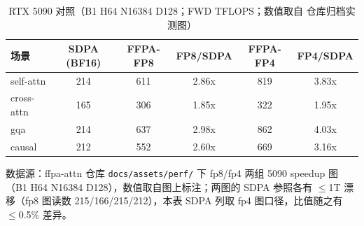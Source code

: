 \begin{table}[!htbp]
  \centering\small
  \caption{RTX 5090 对照（B1 H64 N16384 D128；FWD TFLOPS；数值取自
  仓库归档实测图）}\label{tab:33-5090}
  \begin{tabular}{lccccc}
    \toprule
    场景 & SDPA (BF16) & FFPA-FP8 & FP8/SDPA & FFPA-FP4 & FP4/SDPA \\
    \midrule
    self-attn  & 214 & 611 & 2.86x & 819 & 3.83x \\
    cross-attn & 165 & 306 & 1.85x & 322 & 1.95x \\
    gqa        & 214 & 637 & 2.98x & 862 & 4.03x \\
    causal     & 212 & 552 & 2.60x & 669 & 3.16x \\
    \bottomrule
  \end{tabular}

  \par\vspace{4pt}
  {\footnotesize 数据源：ffpa-attn 仓库
  \texttt{docs/\allowbreak{}assets/\allowbreak{}perf/} 下 fp8/fp4 两组
  5090 speedup 图（B1 H64 N16384 D128），数值取自图上标注；两图的
  SDPA 参照各有 $\le$1T 漂移（fp8 图读数 215/166/215/212），本表
  SDPA 列取 fp4 图口径，比值随之有 $\le$0.5\% 差异。\par}
\end{table}

